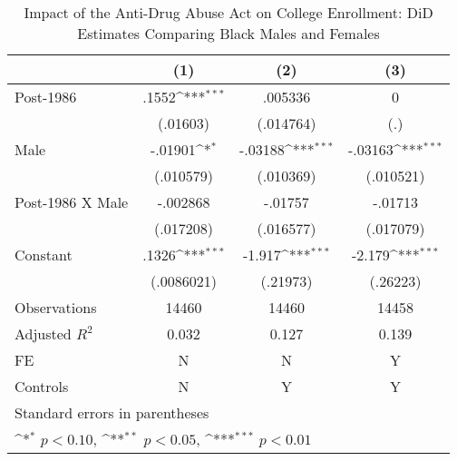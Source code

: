 \begin{table}[htbp]\centering
\def\sym#1{\ifmmode^{#1}\else\(^{#1}\)\fi}
\caption{Impact of the Anti-Drug Abuse Act on College Enrollment: DiD Estimates Comparing Black Males and Females}
\begin{tabular}{l*{3}{c}}
\hline\hline
                    &\multicolumn{1}{c}{(1)}         &\multicolumn{1}{c}{(2)}         &\multicolumn{1}{c}{(3)}         \\
\hline
Post-1986           &       .1552\sym{***}&     .005336         &           0         \\
                    &    (.01603)         &   (.014764)         &         (.)         \\
[1em]
Male                &     -.01901\sym{*}  &     -.03188\sym{***}&     -.03163\sym{***}\\
                    &   (.010579)         &   (.010369)         &   (.010521)         \\
[1em]
Post-1986 X Male    &    -.002868         &     -.01757         &     -.01713         \\
                    &   (.017208)         &   (.016577)         &   (.017079)         \\
[1em]
Constant            &       .1326\sym{***}&      -1.917\sym{***}&      -2.179\sym{***}\\
                    &  (.0086021)         &    (.21973)         &    (.26223)         \\
\hline
Observations        &       14460         &       14460         &       14458         \\
Adjusted \(R^{2}\)  &       0.032         &       0.127         &       0.139         \\
FE                  &           N         &           N         &           Y         \\
Controls            &           N         &           Y         &           Y         \\
\hline\hline
\multicolumn{4}{l}{\footnotesize Standard errors in parentheses}\\
\multicolumn{4}{l}{\footnotesize \sym{*} \(p<0.10\), \sym{**} \(p<0.05\), \sym{***} \(p<0.01\)}\\
\end{tabular}
\end{table}

